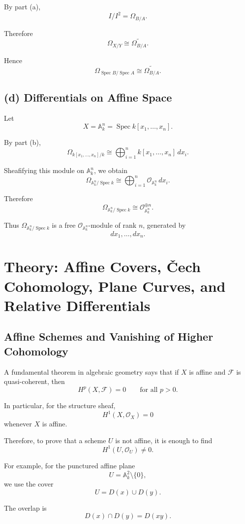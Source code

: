 \documentclass[12pt,a4paper]{article}
\theoremstyle{notespace}
\begin{document}
By part (a),
\[
I/I^2=\Omega_{B/A}.
\]

Therefore
\[
\Omega_{X/Y}
\cong
\widetilde{\Omega_{B/A}}.
\]

Hence
\[
\boxed{
	\Omega_{\operatorname{Spec}B/\operatorname{Spec}A}
	\cong
	\widetilde{\Omega_{B/A}}.
}
\]

\subsection*{(d) Differentials on Affine Space}

Let
\[
X=\mathbb A_k^n
=
\operatorname{Spec}k[x_1,\ldots,x_n].
\]

By part (b),
\[
\Omega_{k[x_1,\ldots,x_n]/k}
\cong
\bigoplus_{i=1}^n k[x_1,\ldots,x_n]\,dx_i.
\]

Sheafifying this module on \(\mathbb A_k^n\), we obtain
\[
\Omega_{\mathbb A_k^n/\operatorname{Spec}k}
\cong
\bigoplus_{i=1}^n
\mathcal O_{\mathbb A_k^n}\,dx_i.
\]

Therefore
\[
\boxed{
	\Omega_{\mathbb A_k^n/\operatorname{Spec}k}
	\cong
	\mathcal O_{\mathbb A_k^n}^{\oplus n}.
}
\]

Thus \(\Omega_{\mathbb A_k^n/\operatorname{Spec}k}\) is a free
\(\mathcal O_{\mathbb A_k^n}\)-module of rank \(n\), generated by
\[
dx_1,\ldots,dx_n.
\]

\section{Theory: Affine Covers, \v{C}ech Cohomology, Plane Curves, and Relative Differentials}

\subsection{Affine Schemes and Vanishing of Higher Cohomology}

A fundamental theorem in algebraic geometry says that if $X$ is affine and
$\mathcal F$ is quasi-coherent, then
\[
H^p(X,\mathcal F)=0
\qquad
\text{for all }p>0.
\]

In particular, for the structure sheaf,
\[
H^1(X,\mathcal O_X)=0
\]
whenever $X$ is affine.

Therefore, to prove that a scheme $U$ is not affine, it is enough to find
\[
H^1(U,\mathcal O_U)\neq 0.
\]

For example, for the punctured affine plane
\[
U=\mathbb A_k^2\setminus\{0\},
\]
we use the cover
\[
U=D(x)\cup D(y).
\]

The overlap is
\[
D(x)\cap D(y)=D(xy).
\]
\end{document}

